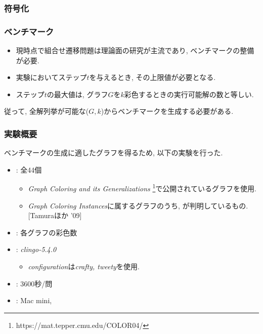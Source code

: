 \documentclass[dvipdfmx,11pt]{beamer}
\begin{document}

\begin{frame}\frametitle{符号化}
  
\end{frame}


\begin{frame}\frametitle{ベンチマーク}

  \begin{itemize}
    \item 現時点で組合せ遷移問題は理論面の研究が主流であり, ベンチマークの整備が必要.
    \item 実験においてステップ$t$を与えるとき, その上限値が必要となる.
    \item ステップ$t$の最大値は, グラフ$G$を$k$彩色するときの実行可能解の数と等しい.
  \end{itemize}

  従って, 全解列挙が可能な($G, k$)からベンチマークを生成する必要がある.
  
\end{frame}


\begin{frame}\frametitle{実験概要}
  ベンチマークの生成に適したグラフを得るため, 以下の実験を行った.
  \begin{itemize}
    \item {}: 全44個
    \begin{itemize}
      \item \textit{Graph Coloring and its Generalizations}
      \footnote{https://mat.tepper.cmu.edu/COLOR04/}で公開されているグラフを使用.
      \item \textit{Graph Coloring Instances}に属するグラフのうち, が判明しているもの.[Tamuraほか '09]
    \end{itemize}
    \item {}: 各グラフの彩色数

    \item {}: \textit{clingo-5.4.0}
      \begin{itemize}
        \item \textit{configuration}は\textit{crafty, tweety}を使用.
      \end{itemize}
    \item {}: 3600秒/問
    \item {}: Mac mini, 
  \end{itemize}
  
\end{frame}
\end{document}
